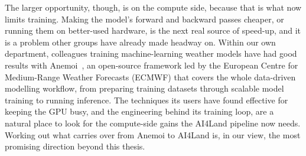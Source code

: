 \documentclass[12pt,a4paper]{article}
\begin{document}
The larger opportunity, though, is on the compute side, because that is what now limits
training. Making the model's forward and backward passes cheaper, or running them on
better-used hardware, is the next real source of speed-up, and it is a problem other groups
have already made headway on. Within our own department, colleagues training machine-learning
weather models have had good results with Anemoi~\cite{anemoi}, an open-source framework led by the European
Centre for Medium-Range Weather Forecasts (ECMWF) that covers the whole data-driven modelling
workflow, from preparing training datasets through scalable model training to running
inference. The techniques its users have found effective for keeping the GPU busy, and the
engineering behind its training loop, are a natural place to look for the compute-side gains
the AI4Land pipeline now needs. Working out what carries over from Anemoi to AI4Land is, in our
view, the most promising direction beyond this thesis.

\clearpage



\end{document}
